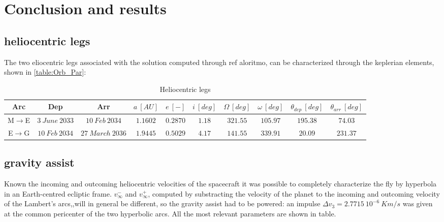 \section{Conclusion and results}
\label{sec:conclusion}
\subsection{heliocentric legs}
\label{subsec:heliocentric}
The two eliocentric legs associated with the solution computed through ref aloritmo, can be characterized through the keplerian elements, shown in \autoref{table:Orb_Par}:
\begin{table}[H]

    \centering
    \begin{tabular}{|c|c|c|c|c|c|c|c|c|c|}
    \hline
    Arc & Dep & Arr & $a  \ [AU]$ & $e \ [-]$ & $i \ [deg]$ & $\Omega \ [deg]$ & $\omega \ [deg]$ & $\theta_{dep} \ [deg]$ & $\theta_{arr} \ [deg]$ \\
    \hline
    M$\to$E & $3 \ June \ 2033$ & $10 \ Feb \ 2034$ & $1.1602$ & $0.2870$ & $1.18$ & $321.55$ & $105.97$ & $195.38$ & $74.03$ \\
    \hline
    E$\to$G & $10 \ Feb \ 2034$ & $27 \ March \ 2036$ & $1.9445$ & $0.5029$ & $4.17$ & $141.55$ & $339.91$ & $20.09$ & $231.37$ \\
    \hline
    \end{tabular}
    
    \caption{Heliocentric legs}
    \label{table:Orb_Par} 
\end{table}

\subsection{gravity assist}

\label{subsec:ga}
Known the incoming and outcoming heliocentric velocities of the spacecraft it was possible to completely characterize the 
fly by hyperbola in an Earth-centred ecliptic frame. $v_{\infty}^{-}$ and $v_{\infty}^{+}$, computed by substracting 
the velocity of the planet to the incoming and outcoming velocity of the Lambert's arcs,,will in general be different, so
the gravity assist had to be powered: an impulse $\Delta v_{3}=2.7715 \ 10^{-6}  \ Km/s $ was given at the common pericenter
of the two hyperbolic arcs. All the most relevant parameters are shown in table.

\cite{curtis_book}